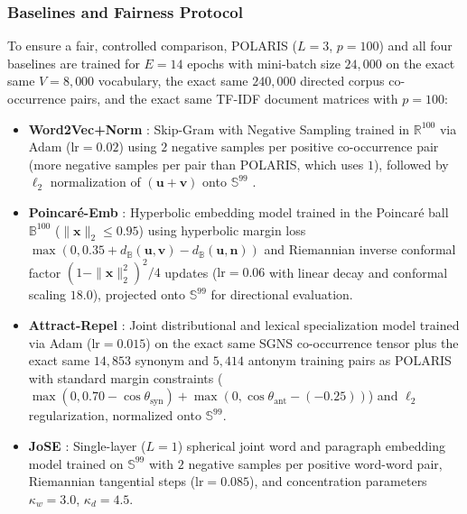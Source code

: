 \documentclass[journal]{IEEEtran}
\begin{document}
\subsubsection{Baselines and Fairness Protocol}
To ensure a fair, controlled comparison, POLARIS ($L=3$, $p=100$) and all four baselines are trained for $E = 14$ epochs with mini-batch size $24,000$ on the exact same $V = 8,000$ vocabulary, the exact same $240,000$ directed corpus co-occurrence pairs, and the exact same TF-IDF document matrices with $p = 100$:
\begin{itemize}
    \item \textbf{Word2Vec+Norm} \cite{mikolov2013distributed}: Skip-Gram with Negative Sampling trained in $\mathbb{R}^{100}$ via Adam ($\text{lr}=0.02$) using $2$ negative samples per positive co-occurrence pair (more negative samples per pair than POLARIS, which uses $1$), followed by $\ell_2$ normalization of $(\mathbf{u} + \mathbf{v})$ onto $\mathbb{S}^{99}$ \cite{levy2014neural}.
    \item \textbf{Poincar\'{e}-Emb} \cite{nickel2017poincare}: Hyperbolic embedding model trained in the Poincar\'{e} ball $\mathbb{B}^{100}$ ($\|\mathbf{x}\|_2 \le 0.95$) using hyperbolic margin loss $\max(0, 0.35 + d_{\mathbb{B}}(\mathbf{u}, \mathbf{v}) - d_{\mathbb{B}}(\mathbf{u}, \mathbf{n}))$ and Riemannian inverse conformal factor $(1 - \|\mathbf{x}\|_2^2)^2 / 4$ updates ($\text{lr}=0.06$ with linear decay and conformal scaling $18.0$), projected onto $\mathbb{S}^{99}$ for directional evaluation.
    \item \textbf{Attract-Repel} \cite{mrksic2017semantic}: Joint distributional and lexical specialization model trained via Adam ($\text{lr}=0.015$) on the exact same SGNS co-occurrence tensor plus the exact same $14,853$ synonym and $5,414$ antonym training pairs as POLARIS with standard margin constraints ($\max(0, 0.70 - \cos\theta_{\text{syn}}) + \max(0, \cos\theta_{\text{ant}} - (-0.25))$) and $\ell_2$ regularization, normalized onto $\mathbb{S}^{99}$.
    \item \textbf{JoSE} \cite{meng2019spherical}: Single-layer ($L=1$) spherical joint word and paragraph embedding model trained on $\mathbb{S}^{99}$ with $2$ negative samples per positive word-word pair, Riemannian tangential steps ($\text{lr}=0.085$), and concentration parameters $\kappa_w = 3.0$, $\kappa_d = 4.5$.
\end{itemize}
\end{document}
